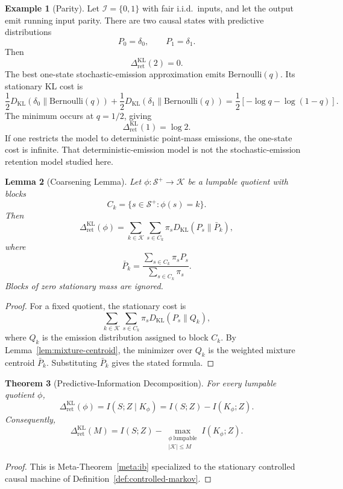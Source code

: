 \documentclass[12pt]{article}
\newtheorem{theorem}{Theorem}[section]
\newtheorem{lemma}[theorem]{Lemma}
\theoremstyle{definition}
\newtheorem{example}[theorem]{Example}
\newcommand{\RetKL}{\Delta_{\mathrm{ret}}^{\mathrm{KL}}}
\newcommand{\Splus}{\mathcal S^{+}}
\begin{document}
\begin{example}[Parity]
\label{ex:parity}
Let $\mathcal I=\{0,1\}$ with fair i.i.d.\ inputs, and let the output emit
running input parity.  There are two causal states with predictive
distributions
\[
P_0=\delta_0,
\qquad
P_1=\delta_1.
\]
Then
\[
\RetKL(2)=0.
\]
The best one-state stochastic-emission approximation emits
$\mathrm{Bernoulli}(q)$.  Its stationary KL cost is
\[
\frac12D_{\mathrm{KL}}(\delta_0\|\mathrm{Bernoulli}(q))
+
\frac12D_{\mathrm{KL}}(\delta_1\|\mathrm{Bernoulli}(q))
=
\frac12[-\log q-\log(1-q)].
\]
The minimum occurs at $q=1/2$, giving
\[
\RetKL(1)=\log 2.
\]
If one restricts the model to deterministic point-mass emissions, the
one-state cost is infinite.  That deterministic-emission model is not the
stochastic-emission retention model studied here.
\end{example}

\begin{lemma}[Coarsening Lemma]
\label{lem:coarsening}
Let $\phi:\Splus\to\mathcal K$ be a lumpable quotient with blocks
\[
C_k=\{s\in\Splus:\phi(s)=k\}.
\]
Then
\[
\RetKL(\phi)
=
\sum_{k\in\mathcal K}
\sum_{s\in C_k}
\pi_s
D_{\mathrm{KL}}(P_s\|\bar P_k),
\]
where
\[
\bar P_k
=
\frac{
\sum_{s\in C_k}\pi_s P_s
}{
\sum_{s\in C_k}\pi_s
}.
\]
Blocks of zero stationary mass are ignored.
\end{lemma}

\begin{proof}
For a fixed quotient, the stationary cost is
\[
\sum_{k\in\mathcal K}
\sum_{s\in C_k}
\pi_s
D_{\mathrm{KL}}(P_s\|Q_k),
\]
where $Q_k$ is the emission distribution assigned to block $C_k$.  By
Lemma~\ref{lem:mixture-centroid}, the minimizer over $Q_k$ is the weighted
mixture centroid $\bar P_k$.  Substituting $\bar P_k$ gives the stated formula.
\end{proof}

\begin{theorem}[Predictive-Information Decomposition]
\label{thm:predictive-info}
For every lumpable quotient $\phi$,
\[
\RetKL(\phi)
=
I(S;Z\mid K_\phi)
=
I(S;Z)-I(K_\phi;Z).
\]
Consequently,
\[
\RetKL(M)
=
I(S;Z)
-
\max_{\substack{
\phi\ \text{lumpable}\\
|\mathcal K|\le M
}}
I(K_\phi;Z).
\]
\end{theorem}

\begin{proof}
This is Meta-Theorem~\ref{meta:ib} specialized to the stationary controlled
causal machine of Definition~\ref{def:controlled-markov}.
\end{proof}
\end{document}
